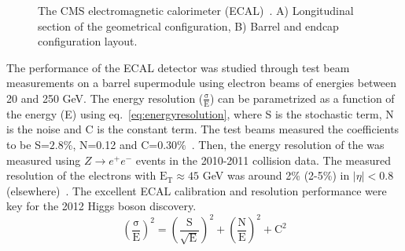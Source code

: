 \begin{figure}[htp!]
\centering
\captionsetup[subfigure]{justification=centering}
\caption[The CMS electrognetic calorimeter (ECAL)]{The CMS electromagnetic calorimeter (ECAL)~\cite{CMS:2008xjf,CMS:2006myw}. A) Longitudinal section of the geometrical configuration, B) Barrel and endcap configuration layout.}
\label{fig:cmsecal}
\end{figure}

The performance of the ECAL detector was studied through test beam measurements on a barrel supermodule using electron beams of energies between 20 and 250 GeV. The energy resolution ($\mathrm{ \frac{\sigma}{E} }$) can be parametrized as a function of the energy (E) using eq.~\ref{eq:energyresolution}, where S is the stochastic term, N is the noise and C is the constant term. The test beams measured the coefficients to be S=$2.8\%$, N=0.12 and C=$0.30\%$~\cite{CMS:2008xjf}. Then, the energy resolution of the was measured using ${Z\rightarrow e^{+}e^{-}}$ events in the 2010-2011 collision data. The measured resolution of the electrons with $\mathrm{E_{T}}\approx45$ GeV was around 2\% (2-5\%) in $|\eta|<0.8$ (elsewhere)~\cite{cmsecalrun1}. The excellent ECAL calibration and resolution performance were key for the 2012 Higgs boson discovery.
\begin{equation}
\mathrm{\left(\frac{\sigma}{E}\right)^{2} = \left(\frac{S}{\sqrt{E}}\right)^{2} + \left(\frac{N}{E}\right)^{2} + C^{2}}
\label{eq:energyresolution}
\end{equation}

